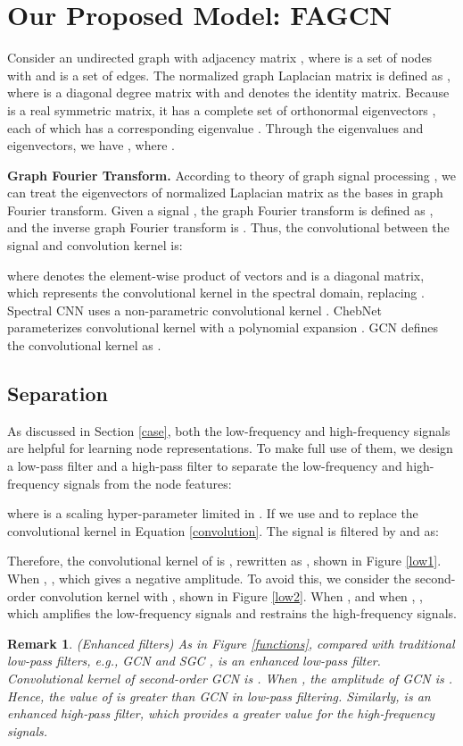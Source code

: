 \documentclass[letterpaper]{article} \usepackage{aaai21}  \usepackage{times}  \usepackage{helvet} \usepackage{courier}  \usepackage[hyphens]{url}  \usepackage{graphicx} \urlstyle{rm} \def\UrlFont{\rm}  \usepackage{natbib}  \usepackage{caption} \frenchspacing  \setlength{\pdfpagewidth}{8.5in}  \setlength{\pdfpageheight}{11in}
\newtheorem{remark}{Remark}
\begin{document}
\section{Our Proposed Model: FAGCN}
\label{separation}

Consider an undirected graph  with adjacency matrix , where  is a set of nodes with  and  is a set of edges. The normalized graph Laplacian matrix is defined as , where  is a diagonal degree matrix with  and  denotes the identity matrix. Because  is a real symmetric matrix, it has a complete set of orthonormal eigenvectors , each of which has a corresponding eigenvalue  \cite{spectralgraph}. Through the eigenvalues and eigenvectors, we have , where .

\textbf{Graph Fourier Transform.}
According to theory of graph signal processing \cite{GSP}, we can treat the eigenvectors of normalized Laplacian matrix as the bases in graph Fourier transform. Given a signal , the graph Fourier transform is defined as , and the inverse graph Fourier transform is . Thus, the convolutional  between the signal  and convolution kernel  is:

where  denotes the element-wise product of vectors and  is a diagonal matrix, which represents the convolutional kernel in the spectral domain, replacing . Spectral CNN \cite{SpectralCNN} uses a non-parametric convolutional kernel . ChebNet \cite{ChebNet} parameterizes convolutional kernel with a polynomial expansion . GCN defines the convolutional kernel as .

\subsection{Separation}
As discussed in Section \ref{case}, both the low-frequency and high-frequency signals are helpful for learning node representations. 
To make full use of them, we design a low-pass filter  and a high-pass filter  to separate the low-frequency and high-frequency signals from the node features:

where  is a scaling hyper-parameter limited in . If we use  and  to replace the convolutional kernel  in Equation \ref{convolution}. The signal  is filtered by  and  as:

Therefore, the convolutional kernel of  is , rewritten as , shown in Figure \ref{low1}. When , , which gives a negative amplitude. 
To avoid this, we consider the second-order convolution kernel  with , shown in Figure \ref{low2}. When ,  and when , , which amplifies the low-frequency signals and restrains the high-frequency signals.
\begin{remark}
	(Enhanced filters) As in Figure \ref{functions}, compared with traditional low-pass filters, e.g., GCN and SGC \cite{SGC},  is an enhanced low-pass filter. Convolutional kernel of second-order GCN is . When , the amplitude of GCN is . Hence, the value of  is greater than GCN in low-pass filtering. Similarly,  is an enhanced high-pass filter, which provides a greater value for the high-frequency signals.
\end{remark}
\end{document}

